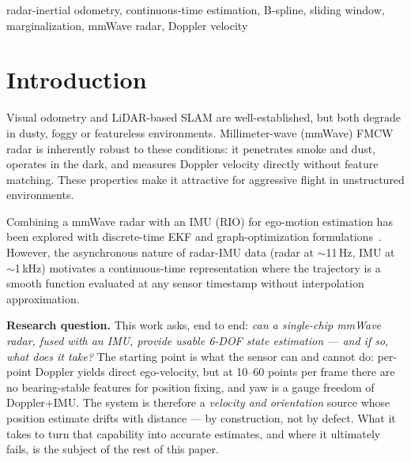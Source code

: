 \documentclass[conference]{IEEEtran}
\begin{document}
\begin{IEEEkeywords}
radar-inertial odometry, continuous-time estimation, B-spline,
sliding window, marginalization, mmWave radar, Doppler velocity
\end{IEEEkeywords}

\section{Introduction}
\label{sec:intro}

Visual odometry and LiDAR-based SLAM are well-established, but both
degrade in dusty, foggy or featureless environments.
Millimeter-wave (mmWave) FMCW radar is inherently robust to these
conditions: it penetrates smoke and dust, operates in the dark, and
measures Doppler velocity directly without feature matching.  These
properties make it attractive for aggressive flight in unstructured
environments.

Combining a mmWave radar with an IMU (RIO) for ego-motion estimation
has been explored with discrete-time EKF and graph-optimization
formulations~\cite{doer2020ekf,kramer2020rve}.  However, the
asynchronous nature of radar-IMU data (radar at $\sim$11\,Hz, IMU at
$\sim$1\,kHz) motivates a continuous-time representation where the
trajectory is a smooth function evaluated at any sensor timestamp
without interpolation approximation.

\textbf{Research question.}
This work asks, end to end: \emph{can a single-chip mmWave radar,
fused with an IMU, provide usable 6-DOF state estimation --- and if
so, what does it take?}  The starting point is what the sensor can and
cannot do: per-point Doppler yields direct ego-velocity, but at
10--60 points per frame there are no bearing-stable features for
position fixing, and yaw is a gauge freedom of Doppler+IMU.  The
system is therefore a \emph{velocity and orientation} source whose
position estimate drifts with distance --- by construction, not by
defect.  What it takes to turn that capability into accurate
estimates, and where it ultimately fails, is the subject of the rest
of this paper.
\end{document}
